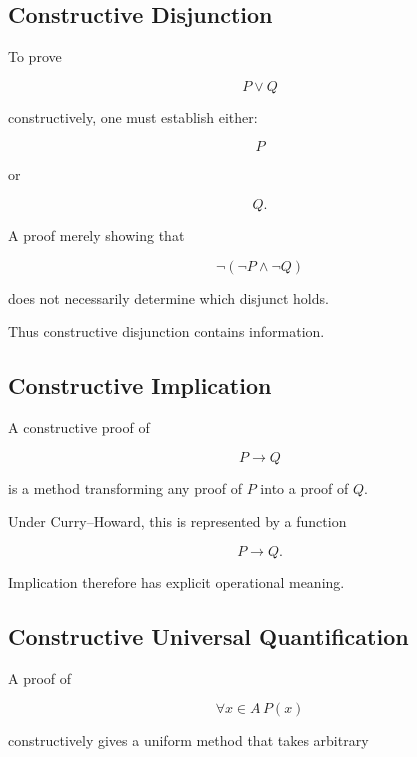 \subsection{Constructive Disjunction}
\label{subsec:constructive-disjunction}

To prove

\[
P\lor Q
\]

constructively, one must establish either:

\[
\boxed{
P
}
\]

or

\[
\boxed{
Q.
}
\]

A proof merely showing that

\[
\neg(\neg P\land\neg Q)
\]

does not necessarily determine which disjunct holds.

Thus constructive disjunction contains information.

\subsection{Constructive Implication}
\label{subsec:constructive-implication}

A constructive proof of

\[
P\rightarrow Q
\]

is a method transforming any proof of \(P\) into a proof of \(Q\).

Under Curry--Howard, this is represented by a function

\[
\boxed{
P\to Q.
}
\]

Implication therefore has explicit operational meaning.

\subsection{Constructive Universal Quantification}
\label{subsec:constructive-universal}

A proof of

\[
\forall x\in A\,P(x)
\]

constructively gives a uniform method that takes arbitrary

